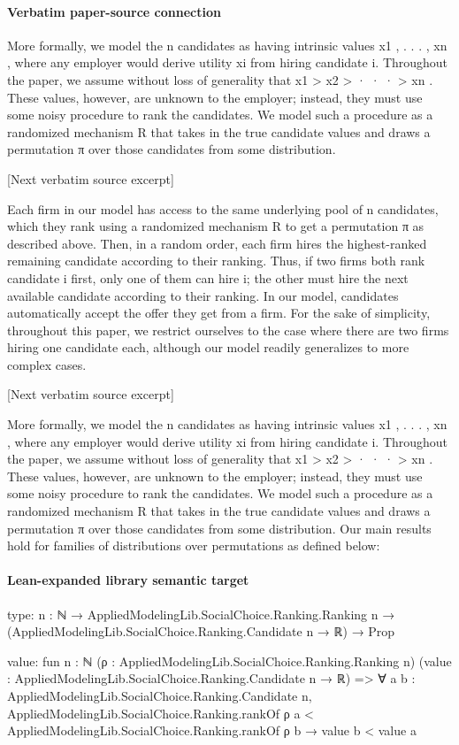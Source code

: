 \documentclass[10pt]{article}
\begin{document}
\paragraph{Verbatim paper-source connection}
\begin{ReviewVerbatim}
More formally, we model the n candidates as having intrinsic values x1 , . . . , xn , where any employer would
derive utility xi from hiring candidate i. Throughout the paper, we assume without loss of generality that
x1 > x2 > · · · > xn . These values, however, are unknown to the employer; instead, they must use some
noisy procedure to rank the candidates. We model such a procedure as a randomized mechanism R that
takes in the true candidate values and draws a permutation π over those candidates from some distribution.

[Next verbatim source excerpt]

Each firm in our model has access to the same underlying pool of n candidates, which they rank using
a randomized mechanism R to get a permutation π as described above. Then, in a random order, each
firm hires the highest-ranked remaining candidate according to their ranking. Thus, if two firms both rank
candidate i first, only one of them can hire i; the other must hire the next available candidate according to
their ranking. In our model, candidates automatically accept the offer they get from a firm. For the sake
of simplicity, throughout this paper, we restrict ourselves to the case where there are two firms hiring one
candidate each, although our model readily generalizes to more complex cases.

[Next verbatim source excerpt]

More formally, we model the n candidates as having intrinsic values x1 , . . . , xn , where any employer would
derive utility xi from hiring candidate i. Throughout the paper, we assume without loss of generality that
x1 > x2 > · · · > xn . These values, however, are unknown to the employer; instead, they must use some
noisy procedure to rank the candidates. We model such a procedure as a randomized mechanism R that
takes in the true candidate values and draws a permutation π over those candidates from some distribution.
Our main results hold for families of distributions over permutations as defined below:
\end{ReviewVerbatim}



\paragraph{Lean-expanded library semantic target}
\begin{ReviewVerbatim}
type:
{n : ℕ} →
  AppliedModelingLib.SocialChoice.Ranking.Ranking n → (AppliedModelingLib.SocialChoice.Ranking.Candidate n → ℝ) → Prop

value:
fun {n : ℕ} (ρ : AppliedModelingLib.SocialChoice.Ranking.Ranking n)
    (value : AppliedModelingLib.SocialChoice.Ranking.Candidate n → ℝ) =>
  ∀ {a b : AppliedModelingLib.SocialChoice.Ranking.Candidate n},
    AppliedModelingLib.SocialChoice.Ranking.rankOf ρ a < AppliedModelingLib.SocialChoice.Ranking.rankOf ρ b →
      value b < value a
\end{ReviewVerbatim}
\end{document}

